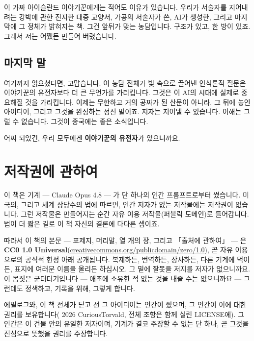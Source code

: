 이 가짜 아이슬란드 이야기꾼에게는 적어도 이유가 있습니다. 우리가 서술자를 지어내려는 강박에 관한 진지한 대중 교양서, 가공의 서술자가 쓴, AI가 생성한, 그리고 마지막에 그 정체가 밝혀지는 책. 그건 앞뒤가 맞는 농담입니다. 구조가 있고, 한 방이 있죠. 그래서 저는 어쨌든 만들어 버렸습니다.

\section*{마지막 말}

여기까지 읽으셨다면, 고맙습니다. 이 농담 전체가 빛 속으로 끌어낸 인식론적 질문은 이야기꾼의 유전자보다 더 큰 무언가를 가리킵니다. 그것은 이 AI의 시대에 실제로 중요해질 것을 가리킵니다. 이제는 무한하고 거의 공짜가 된 산문이 아니라, 그 뒤에 놓인 아이디어, 그리고 그것을 완성하는 정신 말이죠. 저자는 지어낼 수 있습니다. 이해는 그럴 수 없습니다. 그것이 종국에는 좋은 소식입니다.

어찌 되었건, 우리 모두에겐 \textbf{이야기꾼의 유전자}가 있으니까요.

\chapter*{저작권에 관하여}
{}

이 책은 기계 — Claude Opus 4.8 — 가 단 하나의 인간 프롬프트로부터 썼습니다. 미국의, 그리고 세계 상당수의 법에 따르면, 인간 저자가 없는 저작물에는 저작권이 없습니다. 그런 저작물은 만들어지는 순간 자유 이용 저작물(퍼블릭 도메인)로 들어갑니다. 법이 더 짧은 길로 이 책 자신의 결론에 다다른 셈이죠.

따라서 이 책의 본문 — 표제지, 머리말, 열 개의 장, 그리고 「출처에 관하여」 — 은 \textbf{CC0 1.0 Universal}(\url{creativecommons.org/publicdomain/zero/1.0}), 곧 자유 이용으로의 공식적 헌정 아래 공개됩니다. 복제하든, 번역하든, 장사하든, 다른 기계에 먹이든, 표지에 여러분 이름을 올리든 하십시오. 그 밑에 잘못을 저지를 저자가 없으니까요. 이 몸짓은 군더더기입니다 — 애초에 소유한 적 없는 것을 내줄 수는 없으니까요 — 그런데도 정색하고, 기록을 위해, 그렇게 합니다.

에필로그와, 이 책 전체가 딛고 선 그 아이디어는 인간이 썼으며, 그 인간이 이에 대한 권리를 보유합니다(\textcopyright{} 2026 CuriousTorvald, 전체 조항은 함께 실린 LICENSE에). 그 인간은 이 건물 안의 유일한 저자이며, 기계가 결코 주장할 수 없는 단 하나, 곧 그것을 진심으로 뜻했을 권리를 주장합니다.

